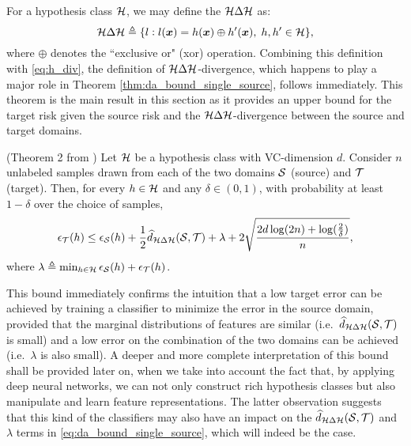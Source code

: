 For a hypothesis class ${\mathcal{H}}$, we may define the  ${\mathcal{H}} \Delta {\mathcal{H}}$ as:
\begin{equation}
\label{eq:h_delta_h}
{\mathcal{H}} \Delta {\mathcal{H}} \triangleq \{l: l({\bm{x}}) = h({\bm{x}}) \oplus h'({\bm{x}}), \; h, h' \in {\mathcal{H}}\},
\end{equation}
where $\oplus$ denotes the ``exclusive or" (xor) operation. Combining this definition with \eqref{eq:h_div}, the definition of ${\mathcal{H}} \Delta {\mathcal{H}}$-divergence, which happens to play a major role in Theorem \ref{thm:da_bound_single_source}, follows immediately. This theorem is the main result in this section as it provides an upper bound for the target risk given the source risk and the ${\mathcal{H}} \Delta {\mathcal{H}}$-divergence between the source and target domains.
\begin{theorem}
	\label{thm:da_bound_single_source} (Theorem 2 from \citet{BenDavid2010}) Let ${\mathcal{H}}$ be a hypothesis class with VC-dimension $d$. Consider $n$ unlabeled samples drawn from each of the two domains ${\mathcal{S}}$ (source) and ${\mathcal{T}}$ (target). Then, for every $h \in {\mathcal{H}}$ and any $\delta \in (0,1)$, with probability at least $1-\delta$ over the choice of samples,
	\begin{equation}
		\label{eq:da_bound_single_source}
		\epsilon_{\mathcal{T}}(h) \leq \epsilon_{\mathcal{S}}(h) + \frac{1}{2} \widehat{d}_{{\mathcal{H}} \Delta {\mathcal{H}}}({\mathcal{S}}, {\mathcal{T}}) + \lambda + 2\sqrt{\frac{2d\log(2n) + \log(\frac{2}{\delta})}{n}},
	\end{equation}
	where $\lambda \triangleq \min_{h \in {\mathcal{H}}} \epsilon_{\mathcal{S}}(h) + \epsilon_{\mathcal{T}}(h)$.
\end{theorem}
This bound immediately confirms the intuition that a low target error can be achieved by training a classifier to minimize the error in the source domain, provided that the marginal distributions of features are similar (i.e.\ $\widehat{d}_{{\mathcal{H}} \Delta {\mathcal{H}}}({\mathcal{S}}, {\mathcal{T}})$ is small) and a low error on the combination of the two domains can be achieved (i.e.\ $\lambda$ is also small). A deeper and more complete interpretation of this bound shall be provided later on, when we take into account the fact that, by applying deep neural networks, we can not only construct rich hypothesis classes but also manipulate and learn feature representations. The latter observation suggests that this kind of the classifiers may also have an impact on the $\widehat{d}_{{\mathcal{H}} \Delta {\mathcal{H}}}({\mathcal{S}}, {\mathcal{T}})$ and $\lambda$ terms in \eqref{eq:da_bound_single_source}, which will indeed be the case.

